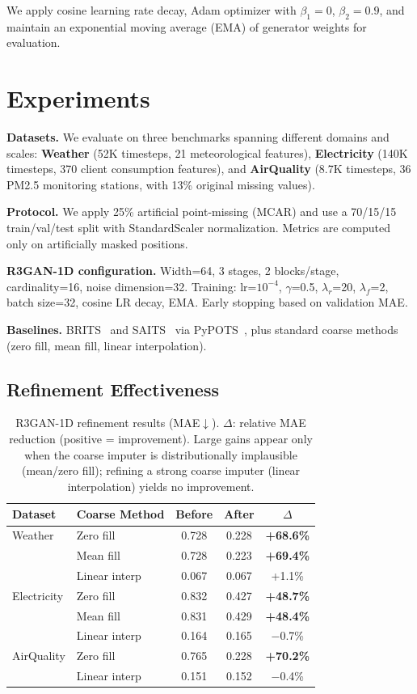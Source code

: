 \documentclass[sigconf,nonacm]{acmart}
\begin{document}
We apply cosine learning rate decay, Adam optimizer with $\beta_1 = 0$, $\beta_2 = 0.9$, and maintain an exponential moving average (EMA) of generator weights for evaluation.

\section{Experiments}

\textbf{Datasets.}
We evaluate on three benchmarks spanning different domains and scales: \textbf{Weather} (52K timesteps, 21 meteorological features), \textbf{Electricity} (140K timesteps, 370 client consumption features), and \textbf{AirQuality} (8.7K timesteps, 36 PM2.5 monitoring stations, with 13\% original missing values).

\textbf{Protocol.}
We apply 25\% artificial point-missing (MCAR) and use a 70/15/15 train/val/test split with StandardScaler normalization. Metrics are computed only on artificially masked positions.

\textbf{R3GAN-1D configuration.}
Width=64, 3 stages, 2 blocks/stage, cardinality=16, noise dimension=32. Training: lr=$10^{-4}$, $\gamma$=0.5, $\lambda_r$=20, $\lambda_f$=2, batch size=32, cosine LR decay, EMA. Early stopping based on validation MAE.

\textbf{Baselines.}
BRITS~\citep{cao2018brits} and SAITS~\citep{du2023saits} via PyPOTS~\citep{du2023saits}, plus standard coarse methods (zero fill, mean fill, linear interpolation).

\subsection{Refinement Effectiveness}

\begin{table}[t]
\centering
\caption{R3GAN-1D refinement results (MAE$\downarrow$). $\Delta$: relative MAE reduction (positive = improvement). Large gains appear only when the coarse imputer is distributionally implausible (mean/zero fill); refining a strong coarse imputer (linear interpolation) yields no improvement.}
\label{tab:refinement}
\small
\begin{tabular}{@{}llccc@{}}
\toprule
Dataset & Coarse Method & Before & After & $\Delta$ \\
\midrule
Weather & Zero fill & 0.728 & 0.228 & \textbf{+68.6\%} \\
        & Mean fill & 0.728 & 0.223 & \textbf{+69.4\%} \\
        & Linear interp & 0.067 & 0.067 & +1.1\% \\
\midrule
Electricity & Zero fill & 0.832 & 0.427 & \textbf{+48.7\%} \\
            & Mean fill & 0.831 & 0.429 & \textbf{+48.4\%} \\
            & Linear interp & 0.164 & 0.165 & $-$0.7\% \\
\midrule
AirQuality & Zero fill & 0.765 & 0.228 & \textbf{+70.2\%} \\
           & Linear interp & 0.151 & 0.152 & $-$0.4\% \\
\bottomrule
\end{tabular}
\end{table}
\end{document}
